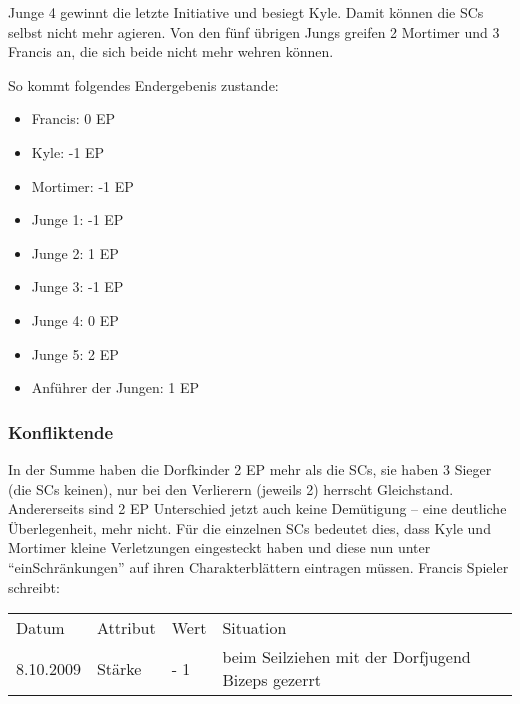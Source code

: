 Junge 4 gewinnt die letzte Initiative und besiegt Kyle. Damit können die SCs selbst nicht mehr agieren. Von den fünf übrigen Jungs greifen 2 Mortimer und 3 Francis an, die sich beide nicht mehr wehren können.

So kommt folgendes Endergebenis zustande:
\begin {itemize}
\item Francis: 0 EP
\item Kyle: -1 EP
\item Mortimer: -1 EP
\item Junge 1: -1 EP
\item Junge 2: 1 EP
\item Junge 3: -1 EP
\item Junge 4: 0 EP
\item Junge 5: 2 EP
\item Anführer der Jungen: 1 EP
\end {itemize}
\onecolumn
\subsubsection{Konfliktende}

In der Summe haben die Dorfkinder 2 EP mehr als die SCs, sie haben 3 Sieger (die SCs keinen), nur bei den Verlierern (jeweils 2) herrscht Gleichstand. Andererseits sind 2 EP Unterschied jetzt auch keine Demütigung -- eine deutliche Überlegenheit, mehr nicht.
Für die einzelnen SCs bedeutet dies, dass Kyle und Mortimer kleine Verletzungen eingesteckt haben und diese nun unter "`einSchränkungen"' auf ihren Charakterblättern eintragen müssen. Francis Spieler schreibt:

\begin{table}[H]
\begin{tabular}{|l|l|l|l|}
\hline
Datum & Attribut & Wert & Situation\\
8.10.2009 & Stärke & - 1 & beim Seilziehen mit der Dorfjugend Bizeps gezerrt\\
\hline
\end{tabular}
\end{table}

